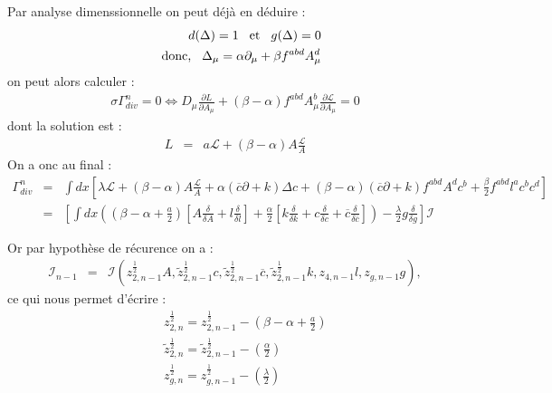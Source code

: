 \documentclass[a4paper,11pt]{article} %
\theoremstyle{plain}
\theoremstyle{definition}
\theoremstyle{remark}
\numberwithin{equation}{section}
\numberwithin{equation}{subsection}
\numberwithin{figure}{section}
\begin{document}
Par analyse dimenssionnelle on peut déjà en déduire :
\begin{eqnarray*}
 && d(\Delta) = 1 \hspace{3mm} \text{et} \hspace{3mm}  g(\Delta) = 0 \\
 && \text{donc,} \hspace{3mm} \Delta_{\mu} = \alpha \partial_{\mu} +\beta f^{abd} A^{d}_{\mu}
\end{eqnarray*}
on peut alors calculer :
\begin{eqnarray*}
 \sigma \Gamma^{n}_{div} = 0 \Leftrightarrow  
D_{\mu} \frac{\partial L}{\partial A_{\mu}} + (\beta-\alpha) f^{abd} A^{b}_{\mu}  \frac{\partial \mathcal{L}}{\partial A_{\mu}} = 0
\end{eqnarray*}
dont la solution est :
\begin{eqnarray*}
 L &=& a \mathcal{L} + (\beta - \alpha) A \frac{\mathcal{L}}{A}
\end{eqnarray*}
On a onc au final :
\begin{eqnarray*}
 \Gamma^{n}_{div} &=& \int dx \left[  \lambda \mathcal{L} + (\beta - \alpha) A \frac{\mathcal{L}}{A} 
+ \alpha ( \overline{c}  \partial + k) \Delta c + (\beta - \alpha) ( \overline{c}  \partial + k)f^{abd} A^{d}c^b 
+ \frac{\beta}{2} f^{abd} l^{a}c^{b}c^{d} \right] \nonumber \\
                  &=& \left[ \int dx \left( ( \beta - \alpha + \frac{a}{2}) \left[A \frac{\delta}{\delta A} 
+ l \frac{\delta}{\delta l} \right] + \frac{\alpha}{2} \left[k \frac{\delta}{\delta k} + c \frac{\delta}{\delta c} 
+ \overline{c} \frac{\delta}{\delta  \overline{c} } \right]  \right) - \frac{\lambda}{2} g \frac{\delta}{\delta g}    \right] \mathcal{I}
\end{eqnarray*}

\noindent
Or par hypothèse de récurence on a : 
\begin{eqnarray*}
 \mathcal{I}_{n-1} &=& \mathcal{I} \left( z_{2,n-1}^{\frac{1}{2}}A , \tilde{z}^{\frac{1}{2}}_{2,n-1}c, 
\tilde{z}^{\frac{1}{2}}_{2,n-1} \overline{c} , \tilde{z}^{\frac{1}{2}}_{2,n-1}k , z_{4,n-1} l, z_{g,n-1} g  \right),
\end{eqnarray*}
ce qui nous permet d'écrire :
\begin{eqnarray*}
 && z_{2,n}^{\frac{1}{2}} = z_{2,n-1}^{\frac{1}{2}} - \left( \beta - \alpha + \frac{a}{2} \right)\\
 && \tilde{z}_{2,n}^{\frac{1}{2}} = \tilde{z}_{2,n-1}^{\frac{1}{2}} - \left( \frac{\alpha}{2}\right) \\
 && z_{g,n}^{\frac{1}{2}} = z_{g,n-1}^{\frac{1}{2}} - \left( \frac{\lambda}{2}\right)
\end{eqnarray*}
\end{document}
